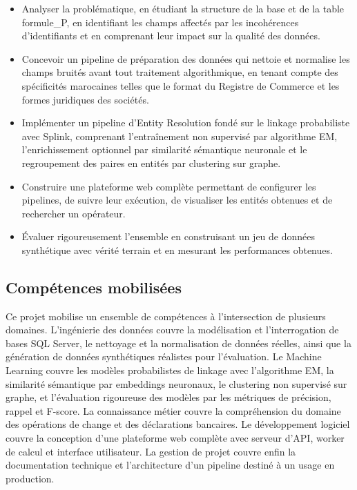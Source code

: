 \begin{itemize}
    \item Analyser la problématique, en étudiant la structure de la base et de la table formule\_P, en identifiant les champs affectés par les incohérences d'identifiants et en comprenant leur impact sur la qualité des données.
    \item Concevoir un pipeline de préparation des données qui nettoie et normalise les champs bruités avant tout traitement algorithmique, en tenant compte des spécificités marocaines telles que le format du Registre de Commerce et les formes juridiques des sociétés.
    \item Implémenter un pipeline d'Entity Resolution fondé sur le linkage probabiliste avec Splink, comprenant l'entraînement non supervisé par algorithme EM, l'enrichissement optionnel par similarité sémantique neuronale et le regroupement des paires en entités par clustering sur graphe.
    \item Construire une plateforme web complète permettant de configurer les pipelines, de suivre leur exécution, de visualiser les entités obtenues et de rechercher un opérateur.
    \item Évaluer rigoureusement l'ensemble en construisant un jeu de données synthétique avec vérité terrain et en mesurant les performances obtenues.
\end{itemize}

\subsection{Compétences mobilisées}

Ce projet mobilise un ensemble de compétences à l'intersection de plusieurs domaines. L'ingénierie des données couvre la modélisation et l'interrogation de bases SQL Server, le nettoyage et la normalisation de données réelles, ainsi que la génération de données synthétiques réalistes pour l'évaluation. Le Machine Learning couvre les modèles probabilistes de linkage avec l'algorithme EM, la similarité sémantique par embeddings neuronaux, le clustering non supervisé sur graphe, et l'évaluation rigoureuse des modèles par les métriques de précision, rappel et F-score. La connaissance métier couvre la compréhension du domaine des opérations de change et des déclarations bancaires. Le développement logiciel couvre la conception d'une plateforme web complète avec serveur d'API, worker de calcul et interface utilisateur. La gestion de projet couvre enfin la documentation technique et l'architecture d'un pipeline destiné à un usage en production.

